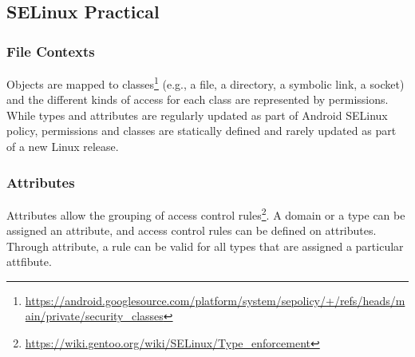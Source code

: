 \subsection{SELinux Practical}
\label{task:20231222_selinux}

\subsubsection{File Contexts}

Objects are mapped to classes\footnote{\url{https://android.googlesource.com/platform/system/sepolicy/+/refs/heads/main/private/security_classes}} (e.g., a file, a directory, a symbolic link, a socket) and the different kinds of access for each class are represented by permissions. While types and attributes are regularly updated as part of Android SELinux policy, permissions and classes are statically defined and rarely updated as part of a new Linux release.

\subsubsection{Attributes}

Attributes allow the grouping of access control rules\footnote{\url{https://wiki.gentoo.org/wiki/SELinux/Type_enforcement}}. A domain or a type can be assigned an attribute, and access control rules can be defined on attributes. Through attribute, a rule can be valid for all types that are assigned a particular attfibute.





